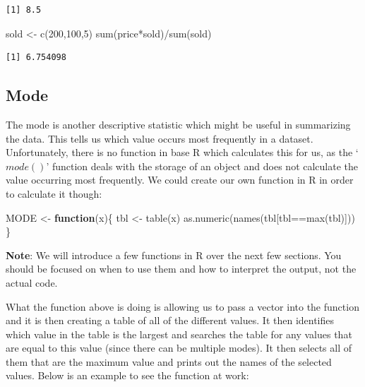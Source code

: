 \documentclass[
  letterpaper,
  DIV=11,
  numbers=noendperiod]{scrreprt}
\newenvironment{Shaded}{\begin{snugshade}}{\end{snugshade}}
\newcommand{\ControlFlowTok}[1]{\textcolor[rgb]{0.00,0.23,0.31}{\textbf{#1}}}
\newcommand{\DecValTok}[1]{\textcolor[rgb]{0.68,0.00,0.00}{#1}}
\newcommand{\FunctionTok}[1]{\textcolor[rgb]{0.28,0.35,0.67}{#1}}
\newcommand{\NormalTok}[1]{\textcolor[rgb]{0.00,0.23,0.31}{#1}}
\newcommand{\OtherTok}[1]{\textcolor[rgb]{0.00,0.23,0.31}{#1}}
\newcommand{\SpecialCharTok}[1]{\textcolor[rgb]{0.37,0.37,0.37}{#1}}
\begin{document}
\begin{verbatim}
[1] 8.5
\end{verbatim}

\begin{Shaded}
\begin{Highlighting}[]
\NormalTok{sold }\OtherTok{\textless{}{-}} \FunctionTok{c}\NormalTok{(}\DecValTok{200}\NormalTok{,}\DecValTok{100}\NormalTok{,}\DecValTok{5}\NormalTok{)}
\FunctionTok{sum}\NormalTok{(price}\SpecialCharTok{*}\NormalTok{sold)}\SpecialCharTok{/}\FunctionTok{sum}\NormalTok{(sold)}
\end{Highlighting}
\end{Shaded}

\begin{verbatim}
[1] 6.754098
\end{verbatim}

\subsection{Mode}\label{mode}

The mode is another descriptive statistic which might be useful in
summarizing the data. This tells us which value occurs most frequently
in a dataset. Unfortunately, there is no function in base R which
calculates this for us, as the `\(mode()\)' function deals with the
storage of an object and does not calculate the value occurring most
frequently. We could create our own function in R in order to calculate
it though:

\begin{Shaded}
\begin{Highlighting}[]
\NormalTok{MODE }\OtherTok{\textless{}{-}} \ControlFlowTok{function}\NormalTok{(x)\{}
\NormalTok{     tbl }\OtherTok{\textless{}{-}} \FunctionTok{table}\NormalTok{(x)}
     \FunctionTok{as.numeric}\NormalTok{(}\FunctionTok{names}\NormalTok{(tbl[tbl}\SpecialCharTok{==}\FunctionTok{max}\NormalTok{(tbl)]))}
\NormalTok{     \}}
\end{Highlighting}
\end{Shaded}

\textbf{Note}: We will introduce a few functions in R over the next few
sections. You should be focused on when to use them and how to interpret
the output, not the actual code.

What the function above is doing is allowing us to pass a vector into
the function and it is then creating a table of all of the different
values. It then identifies which value in the table is the largest and
searches the table for any values that are equal to this value (since
there can be multiple modes). It then selects all of them that are the
maximum value and prints out the names of the selected values. Below is
an example to see the function at work:
\end{document}
